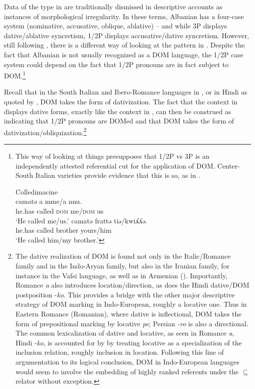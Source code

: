 \documentclass[output=paper,colorlinks,citecolor=brown,modfonts,nonflat]{langsci/langscibook}
\begin{document}
Data of the type in  are traditionally dismissed in descriptive accounts as instances of morphological irregularity. In these terms, Albanian has a four-case system (nominative, accusative, oblique, ablative) – and while 3P displays dative/ablative syncretism, 1/2P displays accusative/dative syncretism. However, still following \citet{ManziniSavoia2014}, there is a different way of looking at the pattern in . Despite the fact that Albanian is not usually recognized as a DOM language, the 1/2P case system could depend on the fact that 1/2P pronouns are in fact subject to DOM.\footnote{This way of looking at things presupposes that 1/2P vs 3P is an independently attested referential cut for the application of DOM. Center-South Italian varieties provide  evidence that this is so, as in .

\ea \label{ex:manzini:i}%
    Colledimacine \citep{ManziniSavoia2005}\\
    \ea
     {camatə} {a} {mme/a} {nnu}.\\
        {he.has}  {called} \textsc{dom} {me/\textsc{dom}} {us}\\
    \glt ‘He called me/us.’
    \ex
       {camatə} {frattə} {tiə/kwiʎʎə}.\\
        {he.has}  called   brother yours/him\\
    \glt ‘He called him/my brother.’
    \z
\zlast
}

\largerpage[2.5]
Recall that in the South Italian and Ibero-Romance languages in , or in Hindi as quoted by \citet{Torrego1998}, DOM takes the form of dativization. The fact that the context in  displays dative forms, exactly like the context in , can then be construed as indicating that 1/2P pronouns are DOMed and that DOM takes the form of dativization/obliquization.\footnote{The dative realization of DOM is found not only in the Italic/Romance family and in the Indo-Aryan family, but also in the Iranian family, for instance in the Vafsi language, as well as in Armenian (\citealt{ManziniFranco2016}). Importantly, Romance \textit{a} also introduces location/direction, as does the Hindi dative/DOM postposition -\textit{ko}. This provides a bridge with the other major descriptive strategy of DOM marking in Indo-European, roughly a locative one. Thus in Eastern Romance (Romanian), where dative is inflectional, DOM takes the form of prepositional marking by locative \textit{pe}; Persian \textit{{}-ro} is also a directional.  The common lexicalization of dative and locative, as seen in Romance \textit{a}, Hindi -\textit{ko}, is accounted for by \citet{FrancoManzini2017Ins} by treating locative as a specialization of the inclusion relation, roughly inclusion in location. Following this line of argumentation to its logical conclusion, DOM in Indo-European languages would seem to involve the embedding of highly ranked referents under the \textrm{${\subseteq}$} relator without exception.}
\end{document}
